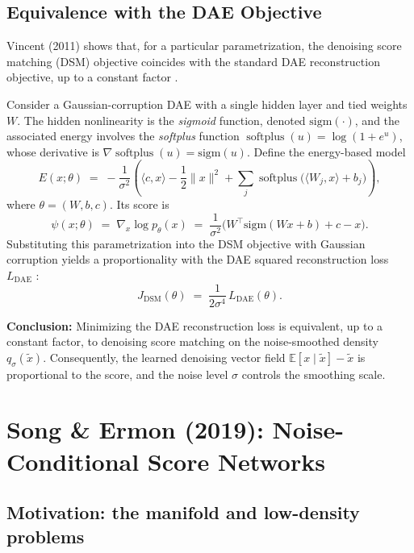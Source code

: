 \documentclass[11pt,a4paper]{article}
\begin{document}
\subsection{Equivalence with the DAE Objective}

Vincent (2011) shows that, for a particular parametrization, the denoising score matching (DSM) objective coincides with the standard DAE reconstruction objective, up to a constant factor \cite{vincent2011}.

\begin{tcolorbox}[colback=gray!5!white,colframe=black,title={Theorem: DSM $\equiv$ DAE (Vincent, 2011)}, left=2pt,right=2pt,top=2pt,bottom=2pt]
Consider a Gaussian-corruption DAE with a single hidden layer and tied weights $W$. The hidden nonlinearity is the \emph{sigmoid} function, denoted $\mathrm{sigm}(\cdot)$, and the associated energy involves the \emph{softplus} function $\operatorname{softplus}(u)=\log(1+e^{u})$, whose derivative is $\nabla \operatorname{softplus}(u)=\mathrm{sigm}(u)$.
Define the energy-based model
\[
E(x;\theta) \;=\; -\frac{1}{\sigma^{2}}\left(\langle c, x\rangle - \frac{1}{2}\|x\|^{2} + \sum_{j}\operatorname{softplus}\!\big(\langle W_{j}, x\rangle + b_{j}\big)\right),
\]
where $\theta=(W,b,c)$. Its score is
\[
\psi(x;\theta) \;=\; \nabla_x \log p_\theta(x)
\;=\; \frac{1}{\sigma^{2}}\Big(W^{\top}\mathrm{sigm}(Wx+b) + c - x\Big).
\]
Substituting this parametrization into the DSM objective with Gaussian corruption yields a proportionality with the DAE squared reconstruction loss $L_{\mathrm{DAE}}$ \cite{vincent2011}:
\begin{equation}
J_{\mathrm{DSM}}(\theta) \;=\; \frac{1}{2\sigma^{4}}\,L_{\mathrm{DAE}}(\theta).
\end{equation}
\end{tcolorbox}

\textbf{Conclusion:} Minimizing the DAE reconstruction loss is equivalent, up to a constant factor, to denoising score matching on the noise-smoothed density $q_\sigma(\tilde{x})$. Consequently, the learned denoising vector field $\mathbb{E}[x\mid \tilde{x}] - \tilde{x}$ is proportional to the score, and the noise level $\sigma$ controls the smoothing scale.

\section{Song \& Ermon (2019): Noise-Conditional Score Networks}

\subsection{Motivation: the manifold and low-density problems}
\end{document}
